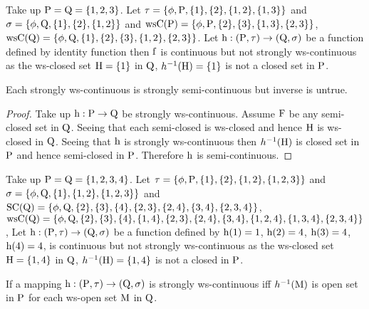 \begin{exm}\label{exam3.3.3}
Take up $\mathrm{P}=\mathrm{Q}= \{1, 2, 3\}$. Let $\tau = \{\phi, \mathrm{P}, \{1\}, \{2\}, \{1, 2\},\{1,3\}\}$ and $\sigma =\{\phi, \mathrm{Q}, \{1\}, \{2\}, \{1, 2\}\}$ and $\mathrm{ws}\mathrm{C}(\mathrm{P})= \{\phi, \mathrm{P}, \{2\}, \{3\}, \{1, 3\},\{2,3\}\}$,\break $\mathrm{ws}\mathrm{C}(\mathrm{Q}) = \{\phi, \mathrm{Q}, \{1\}, \{2\},\{3\}, \{1, 2\},\{2,3\}\}$. Let $\mathrm{h}: (\mathrm{P}, \tau)\to (\mathrm{Q}, \sigma)$ be a function defined by identity function then $\mathrm{f}$ is continuous but not strongly ws-continuous as the ws-closed set $\mathrm{H}=\{1\}$ in $\mathrm{Q}$, $h^{-1}(\mathrm{H})=\{1\}$  is not a closed set in $\mathrm{P}$.
\end{exm}

\begin{thm}\label{thm3.3.7}
Each strongly ws-continuous is strongly semi-continuous but inverse is untrue.
\end{thm}

\begin{proof}
Take up $\mathrm{h}: \mathrm{P}\to \mathrm{Q}$ be strongly ws-continuous. Assume $\mathrm{F}$ be any semi-closed set in $\mathrm{Q}$. Seeing that each semi-closed is ws-closed and hence $\mathrm{H}$ is ws-closed in $\mathrm{Q}$. Seeing that $\mathrm{h}$ is strongly ws-continuous then $h^{-1}(\mathrm{H})$ is closed set in $\mathrm{P}$ and hence semi-closed in $\mathrm{P}$. Therefore $\mathrm{h}$ is semi-continuous.
\end{proof}

\begin{exm}\label{exam3.3.4}
Take up $\mathrm{P}= \mathrm{Q} = \{1, 2, 3, 4\}$. Let $\tau = \{\phi, \TSP, \{1\}, \{2\}, \{1, 2\},\break \{1,2,3\}\}$ and $\sigma =\{\phi, \mathrm{Q}, \{1\}, \{1,2\}, \{1,2,3\}\}$ and $\TSS\TSC(\TSQ)= \{\phi, \TSQ, \{2\}, \{3\}, \{4\},\break \{2, 3\},\{2, 4\}, \{3, 4\}, \{2, 3,4\}\}$, $\ws\TSC(\TSQ)= \{\phi, \TSQ, \{2\}, \{3\}, \{4\},\{1,4\},\{2,3\},\{2,4\},\break \{3,4\},\{1,2,4\},\{1,3,4\},\{2,3,4\}\}$, Let $\mathrm{h}: (\mathrm{P}, \tau )\to (\mathrm{Q}, \sigma)$ be a function defined by $\mathrm{h}(1)=1$, $\mathrm{h}(2)=4$, $\mathrm{h}(3)=4$, $\mathrm{h}(4)=4$, is continuous but not strongly ws-continuous as the ws-closed set $\mathrm{H}=\{1,4\}$ in $\mathrm{Q}$, $h^{-1}(\mathrm{H})=\{1,4\}$ is not a closed in $\mathrm{P}$.
\end{exm}

\begin{thm}\label{thm3.3.8}
If a mapping $\mathrm{h}: (\mathrm{P},\tau)\to (\mathrm{Q}, \sigma)$ is strongly ws-continuous iff $h^{-1}(\mathrm{M})$ is open set in $\mathrm{P}$ for each ws-open set $\mathrm{M}$ in $\mathrm{Q}$.
\end{thm}

